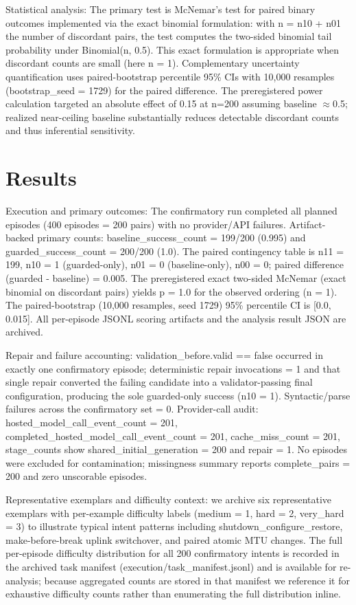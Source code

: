 \documentclass[conference]{IEEEtran}
\begin{document}
Statistical analysis: The primary test is McNemar's test for paired binary outcomes implemented via the exact binomial formulation: with n = n10 + n01 the number of discordant pairs, the test computes the two-sided binomial tail probability under Binomial(n, 0.5). This exact formulation is appropriate when discordant counts are small (here n = 1). Complementary uncertainty quantification uses paired-bootstrap percentile 95\% CIs with 10,000 resamples (bootstrap\_seed = 1729) for the paired difference. The preregistered power calculation targeted an absolute effect of 0.15 at n=200 assuming baseline \ensuremath{\approx}0.5; realized near-ceiling baseline substantially reduces detectable discordant counts and thus inferential sensitivity.

\section{Results}
Execution and primary outcomes: The confirmatory run completed all planned episodes (400 episodes = 200 pairs) with no provider/API failures. Artifact-backed primary counts: baseline\_success\_count = 199/200 (0.995) and guarded\_success\_count = 200/200 (1.0). The paired contingency table is n11 = 199, n10 = 1 (guarded-only), n01 = 0 (baseline-only), n00 = 0; paired difference (guarded - baseline) = 0.005. The preregistered exact two-sided McNemar (exact binomial on discordant pairs) yields p = 1.0 for the observed ordering (n = 1). The paired-bootstrap (10,000 resamples, seed 1729) 95\% percentile CI is [0.0, 0.015]. All per-episode JSONL scoring artifacts and the analysis result JSON are archived.

Repair and failure accounting: validation\_before.valid == false occurred in exactly one confirmatory episode; deterministic repair invocations = 1 and that single repair converted the failing candidate into a validator-passing final configuration, producing the sole guarded-only success (n10 = 1). Syntactic/parse failures across the confirmatory set = 0. Provider-call audit: hosted\_model\_call\_event\_count = 201, completed\_hosted\_model\_call\_event\_count = 201, cache\_miss\_count = 201, stage\_counts show shared\_initial\_generation = 200 and repair = 1. No episodes were excluded for contamination; missingness summary reports complete\_pairs = 200 and zero unscorable episodes.

Representative exemplars and difficulty context: we archive six representative exemplars with per-example difficulty labels (medium = 1, hard = 2, very\_hard = 3) to illustrate typical intent patterns including shutdown\_configure\_restore, make-before-break uplink switchover, and paired atomic MTU changes. The full per-episode difficulty distribution for all 200 confirmatory intents is recorded in the archived task manifest (execution/task\_manifest.jsonl) and is available for re-analysis; because aggregated counts are stored in that manifest we reference it for exhaustive difficulty counts rather than enumerating the full distribution inline.
\end{document}
